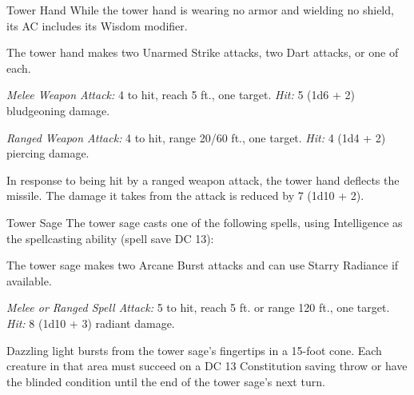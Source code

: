 \documentclass[10pt,a4paper,twoside,bg=print,twocolumn,openany,nodeprecatedcode]{dndbook}
\begin{document}
\begin{DndMonster}[float=t]{Tower Hand}
\DndMonsterBasics[
armor-class = {14 (Unarmored Defense)},
hit-points = {\DndDice{4d8 + 4}},
speed = {40 ft.}
]
\DndMonsterAbilityScores[
 str = 10,
 dex = 14,
 con = 12,
 int = 12,
 wis = 14,
 cha = 9
]
\DndMonsterDetails[
skills = {Insight +4},
languages = {Common},
challenge = 1/2,
]
While the tower hand is wearing no armor and wielding no shield, its AC includes its Wisdom modifier.

The tower hand makes two Unarmed Strike attacks, two Dart attacks, or one of each.

\textsl{Melee Weapon Attack:} 4 to hit, reach 5 ft., one target. \textsl{Hit:} 5 (1d6 + 2) bludgeoning damage.

\textsl{Ranged Weapon Attack:} 4 to hit, range 20/60 ft., one target. \textsl{Hit:} 4 (1d4 + 2) piercing damage.

In response to being hit by a ranged weapon attack, the tower hand deflects the missile. The damage it takes from the attack is reduced by 7 (1d10 + 2).

\end{DndMonster}



\begin{DndMonster}[float=t]{Tower Sage}
\DndMonsterBasics[
armor-class = {10 (13 with \textit{mage armor})},
hit-points = {\DndDice{5d8}},
speed = {30 ft.}
]
\DndMonsterAbilityScores[
 str = 10,
 dex = 10,
 con = 10,
 int = 16,
 wis = 14,
 cha = 16
]
\DndMonsterDetails[
skills = {Arcana +5, History +5, Insight +4},
languages = {Common plus any three languages},
challenge = 1,
]
The tower sage casts one of the following spells, using Intelligence as the spellcasting ability (spell save DC 13):
\begin{DndMonsterSpells}
\end{DndMonsterSpells}
The tower sage makes two Arcane Burst attacks and can use Starry Radiance if available.

\textsl{Melee or Ranged Spell Attack:} 5 to hit, reach 5 ft. or range 120 ft., one target. \textsl{Hit:} 8 (1d10 + 3) radiant damage.

Dazzling light bursts from the tower sage's fingertips in a 15-foot cone. Each creature in that area must succeed on a DC 13 Constitution saving throw or have the blinded condition until the end of the tower sage's next turn.

\end{DndMonster}
\end{document}
